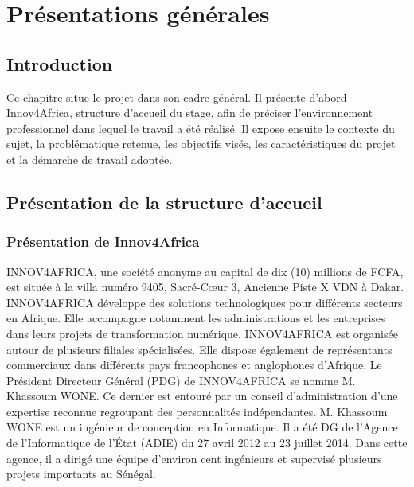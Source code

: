 \chapter{Présentations générales}

\section*{Introduction}

Ce chapitre situe le projet dans son cadre général. Il présente d'abord
Innov4Africa, structure d'accueil du stage, afin de préciser l'environnement
professionnel dans lequel le travail a été réalisé. Il expose ensuite le
contexte du sujet, la problématique retenue, les objectifs visés, les
caractéristiques du projet et la démarche de travail adoptée.

\section{Présentation de la structure d'accueil}

\subsection{Présentation de Innov4Africa}
INNOV4AFRICA, une société anonyme au capital de dix (10) millions de FCFA, est située à la villa
numéro 9405, Sacré-Cœur 3, Ancienne Piste X VDN à Dakar.
INNOV4AFRICA développe des solutions technologiques pour différents secteurs
en Afrique. Elle accompagne notamment les administrations et les entreprises
dans leurs projets de transformation numérique.
INNOV4AFRICA est organisée autour de plusieurs filiales spécialisées. Elle
dispose également de représentants commerciaux dans différents pays
francophones et anglophones d'Afrique.
Le Président Directeur Général (PDG) de INNOV4AFRICA se nomme M. Khassoum WONE. Ce
dernier est entouré par un conseil d'administration d'une expertise reconnue regroupant des
personnalités indépendantes. M. Khassoum WONE est un ingénieur de conception en Informatique.
Il a été DG de l'Agence de l'Informatique de l'État (ADIE) du 27 avril 2012 au 23 juillet 2014.
Dans cette agence, il a dirigé une équipe d'environ cent ingénieurs et supervisé plusieurs projets
importants au Sénégal.

